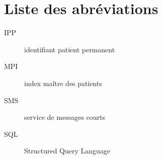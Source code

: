 
{}\nopagebreak
\chapter*{Liste des abréviations}

\begin{description}
  \item[IPP] identifiant patient permanent
  \item[MPI] index maître des patients
  \item[SMS] service de messages courts
  \item[SQL] Structured Query Language
\end{description}
